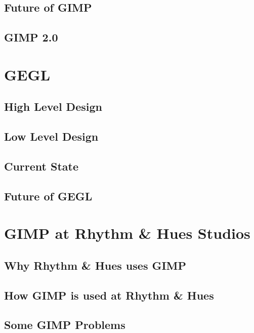 \documentclass{report}
\begin{document}
\section{Future of GIMP} 

\section{GIMP 2.0}



\chapter{GEGL}

\section{High Level Design}

\section{Low Level Design}

\section{Current State}

\section{Future of GEGL}


\chapter{GIMP at Rhythm \& Hues Studios}

\section{Why Rhythm \& Hues uses GIMP}

\section{How GIMP is used at Rhythm \& Hues}

\section{Some GIMP Problems}

\end{document}

